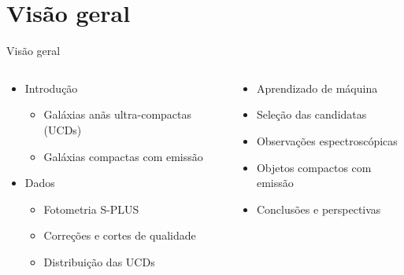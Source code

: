 
\section{Visão geral}
\begin{frame}[c]{Visão geral}
    \begin{columns}[c]
        \begin{column}{0.48\linewidth}
            \begin{splusbox}{}
                \begin{itemize}
                    \item Introdução
                    \begin{itemize}
                        \item Galáxias anãs ultra-compactas (UCDs)
                        \item Galáxias compactas com emissão
                    \end{itemize}
                    \item Dados
                    \begin{itemize}
                        \item Fotometria S-PLUS
                        \item Correções e cortes de qualidade
                        \item Distribuição das UCDs
                    \end{itemize}
                \end{itemize}
            \end{splusbox}
        \end{column}
        \begin{column}{0.48\linewidth}
            \begin{splusbox}{}
                \begin{itemize}
                    \item Aprendizado de máquina
                    \item Seleção das candidatas
                    \item Observações espectroscópicas
                    \item Objetos compactos com emissão
                    \item Conclusões e perspectivas
                \end{itemize}
            \end{splusbox}
        \end{column}
    \end{columns}
\end{frame}

